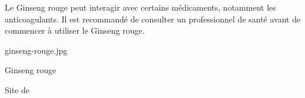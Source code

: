 {%
   Le Ginseng rouge peut interagir avec certains médicaments, notamment les anticoagulants. Il est recommandé de consulter un professionnel de santé avant de commencer à utiliser le Ginseng rouge.
 }

{%
    ginseng-rouge.jpg
}

{%
    Ginseng rouge
}

{%
Site de 
}